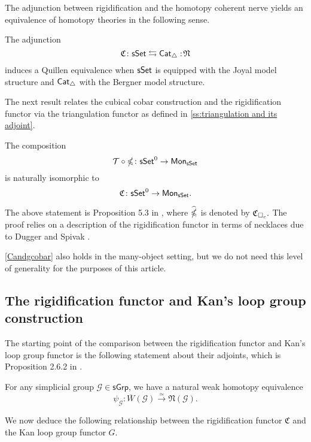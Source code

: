 The adjunction between rigidification and the homotopy coherent nerve yields an equivalence of homotopy theories in the following sense.

\begin{theorem} \label{joyalbergner}
	The adjunction $$ \mathfrak{C} \colon \mathsf{sSet} \leftrightarrows \mathsf{Cat}_{\triangle} :\!\mathfrak{N}$$ induces a Quillen equivalence when $\mathsf{sSet}$ is equipped with the Joyal model structure and $\mathsf{Cat}_{\triangle}$ with the Bergner model structure.
\end{theorem}

The next result relates the cubical cobar construction and the rigidification functor via the triangulation functor as defined in  \cref{ss:triangulation and its adjoint}.

\begin{proposition}\label{Candgcobar}
	The composition 
	$$\mathcal{T} \circ \operatorname{\mathbb{\Omega}} \colon \mathsf{sSet}^0 \to \mathsf{Mon}_{\mathsf{sSet}}$$ is naturally isomorphic to
	$$\mathfrak{C} \colon \mathsf{sSet}^0 \to \mathsf{Mon}_{\mathsf{sSet}}.$$
\end{proposition}

The above statement is Proposition 5.3 in \cite{rivera2018cubical}, where $\widehat{\operatorname{\mathbb{\Omega}}}$ is denoted by $\mathfrak{C}_{\square_c}.$ The proof relies on a description of the rigidification functor in terms of necklaces due to Dugger and Spivak \cite{dugger2011rigidification}. 

\cref{Candgcobar} also holds in the many-object setting, but we do not need this level of generality for the purposes of this article.




\subsection{The rigidification functor and Kan's loop group construction}

The starting point of the comparison between the rigidification functor and Kan's loop group functor is the following statement about their adjoints, which is Proposition 2.6.2 in \cite{hinich2007deformation}.

\begin{proposition} \label{hinich}
	For any simplicial group $\mathcal{G} \in \mathsf{sGrp}$, we have a natural weak homotopy equivalence
	$$\psi_{\mathcal{G}} \colon \overline{W}(\mathcal{G}) \xrightarrow{\simeq} \mathfrak{N}(\mathcal{G}).$$
\end{proposition} 

We now deduce the following relationship between the rigidification functor $\mathfrak{C}$ and the Kan loop group functor $G$.


